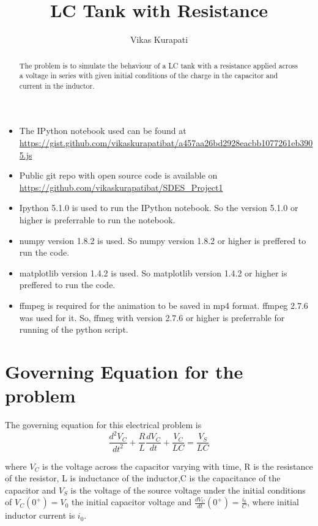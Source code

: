 \documentclass[12pt, a4paper]{report}
\title{\textbf{LC Tank with Resistance}}
\author{Vikas Kurapati}
\affil{Roll No. : 130010058}
\begin{document}
\maketitle
\newpage

\begin{abstract}
 The problem is to simulate the behaviour of a LC tank with a resistance applied across a voltage in series with given initial conditions of the charge in the capacitor and current in the inductor.
\end{abstract}

\begin{itemize}
\item The IPython notebook used can be found at \url{https://gist.github.com/vikaskurapatibat/a457aa26bd2928eacbb1077261eb3905.js}
\item Public git repo with open source code is available on \url{https://github.com/vikaskurapatibat/SDES_Project1}
\item Ipython 5.1.0 is used to run the IPython notebook. So the version 5.1.0 or higher is preferrable to run the notebook.
\item numpy version 1.8.2 is used. So numpy version 1.8.2 or higher is preffered to run the code.
\item matplotlib version 1.4.2 is used. So matplotlib version 1.4.2 or higher is preffered to run the code. \cite{matplotlib}
\item ffmpeg is required for the animation to be saved in mp4 format. ffmpeg 2.7.6 was used for it. So, ffmeg with version 2.7.6 or higher is preferrable for running of the python script.
\end{itemize}


\section*{Governing Equation for the problem}
The governing equation for this electrical problem is  \cite{RLC}
\begin{equation}
 \frac{d^2V_C}{dt^2} + \frac{R}{L}\frac{dV_C}{dt} + \frac{V_C}{LC} = \frac{V_S}{LC}
\end{equation}

where $V_C$ is the voltage across the capacitor varying with time, R is the resistance of the resistor, L is inductance of the inductor,C is the capacitance of the capacitor and $V_S$ is the voltage of the source voltage under the initial conditions of $V_C(0^+) = V_0$ the initial capacitor voltage and $\frac{dV_C}{dt}(0^+) = \frac{i_0}{C}$, where initial inductor current is $i_0$. \\
\end{document}
